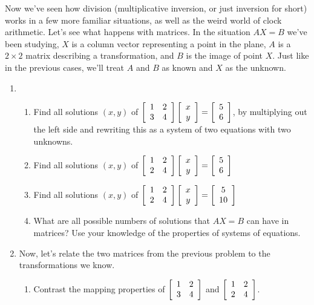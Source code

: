 \documentclass[../gatm.tex]{subfiles}
\begin{document}
Now we've seen how division (multiplicative inversion, or just inversion for short) works in a few more familiar situations, as well as the weird world of clock arithmetic. Let's see what happens with matrices. In the situation $AX=B$ we've been studying, $X$ is a column vector representing a point in the plane, $A$ is a $2\times 2$ matrix describing a transformation, and $B$ is the image of point $X$. Just like in the previous cases, we'll treat $A$ and $B$ as known and $X$ as the unknown.

\begin{enumerate}
\item \begin{enumerate}
\item Find all solutions $(x,y)$ of $\left[\begin{array}{cc} 1 & 2 \\ 3 & 4 \end{array}\right]\left[\begin{array}{c} x \\ y \end{array}\right]=\left[\begin{array}{c} 5 \\ 6 \end{array}\right]$, by multiplying out the left side and rewriting this as a system of two equations with two unknowns.
\item Find all solutions $(x,y)$ of $\left[\begin{array}{cc} 1 & 2 \\ 2 & 4 \end{array}\right]\left[\begin{array}{c} x \\ y \end{array}\right]=\left[\begin{array}{c} 5 \\ 6 \end{array}\right]$
\item Find all solutions $(x,y)$ of $\left[\begin{array}{cc} 1 & 2 \\ 2 & 4 \end{array}\right]\left[\begin{array}{c} x \\ y \end{array}\right]=\left[\begin{array}{c} 5 \\ 10 \end{array}\right]$
\item What are all possible numbers of solutions that $AX=B$ can have in matrices? Use your knowledge of the properties of systems of equations.
\end{enumerate}
\item Now, let's relate the two matrices from the previous problem to the transformations we know.
\begin{enumerate}
\item Contrast the mapping properties of $\left[\begin{array}{cc} 1 & 2 \\ 3 & 4 \end{array}\right]$ and $\left[\begin{array}{cc} 1 & 2 \\ 2 & 4 \end{array}\right]$.

\end{enumerate}
\end{enumerate}
\end{document}
